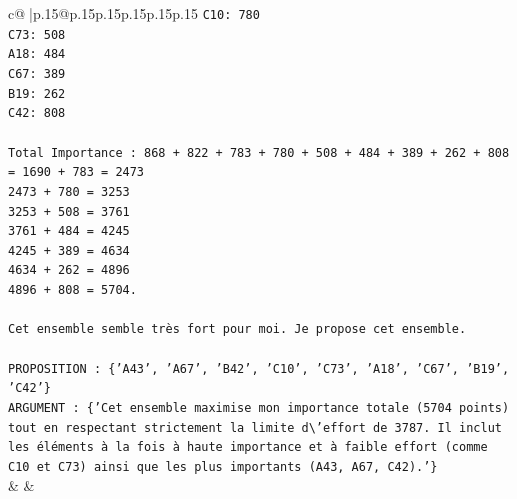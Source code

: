 \documentclass{article}
\begin{document}
{\begin{supertabular}{c@{$\;$}|p{.15\linewidth}@{}p{.15\linewidth}p{.15\linewidth}p{.15\linewidth}p{.15\linewidth}p{.15\linewidth}}
{{{\texttt{C10: 780} \\
\texttt{C73: 508} \\
\texttt{A18: 484} \\
\texttt{C67: 389} \\
\texttt{B19: 262} \\
\texttt{C42: 808} \\
\\ 
\texttt{Total Importance : 868 + 822 + 783 + 780 + 508 + 484 + 389 + 262 + 808} \\
\texttt{= 1690 + 783 = 2473} \\
\texttt{2473 + 780 = 3253} \\
\texttt{3253 + 508 = 3761} \\
\texttt{3761 + 484 = 4245} \\
\texttt{4245 + 389 = 4634} \\
\texttt{4634 + 262 = 4896} \\
\texttt{4896 + 808 = 5704.} \\
\\ 
\texttt{Cet ensemble semble très fort pour moi. Je propose cet ensemble.} \\
\\ 
\texttt{PROPOSITION : \{'A43', 'A67', 'B42', 'C10', 'C73', 'A18', 'C67', 'B19', 'C42'\}} \\
\texttt{ARGUMENT : \{'Cet ensemble maximise mon importance totale (5704 points) tout en respectant strictement la limite d\textbackslash{}'effort de 3787. Il inclut les éléments à la fois à haute importance et à faible effort (comme C10 et C73) ainsi que les plus importants (A43, A67, C42).'\}} \\
            }
        }
    }
    & & \\ \\


\end{supertabular}}
\end{document}
